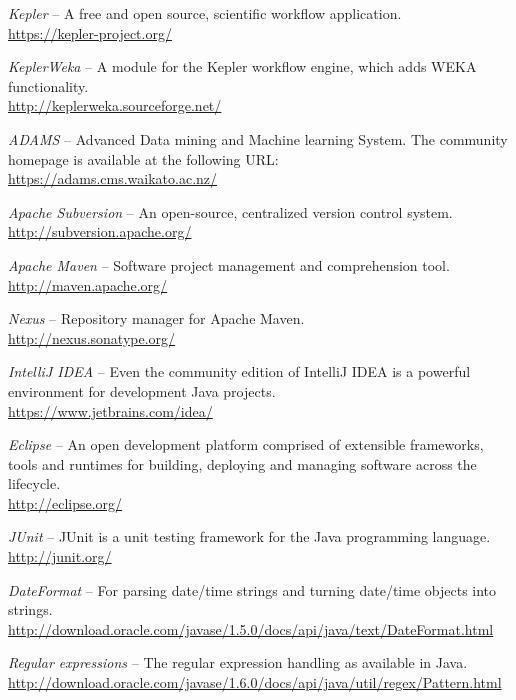 
\begin{thebibliography}{999}

		\textit{Kepler} -- A free and open source, scientific workflow application. \\
		\url{https://kepler-project.org/}{}

		\textit{KeplerWeka} -- A module for the Kepler workflow engine, which adds
		WEKA functionality. \\
		\url{http://keplerweka.sourceforge.net/}{}

		\textit{ADAMS} -- Advanced Data mining and Machine learning System. The
		community homepage is available at the following URL: \\
		\url{https://adams.cms.waikato.ac.nz/}{}

		\textit{Apache Subversion} -- An open-source, centralized version control
		system. \\
		\url{http://subversion.apache.org/}{}

		\textit{Apache Maven} -- Software project management and comprehension tool.
		\\
		\url{http://maven.apache.org/}{}

		\textit{Nexus} -- Repository manager for Apache Maven. \\
		\url{http://nexus.sonatype.org/}{}

		\textit{IntelliJ IDEA} -- Even the community edition of IntelliJ IDEA
		is a powerful environment for development Java projects. \\
		\url{https://www.jetbrains.com/idea/}{}

		\textit{Eclipse} -- An open development platform comprised of extensible
		frameworks, tools and runtimes for building, deploying and managing
		software across the lifecycle. \\
		\url{http://eclipse.org/}{}

		\textit{JUnit} -- JUnit is a unit testing framework for the Java
		programming language. \\
		\url{http://junit.org/}{}
		
		\textit{DateFormat} -- For parsing date/time strings and turning date/time
		objects into strings.
		\url{http://download.oracle.com/javase/1.5.0/docs/api/java/text/DateFormat.html}{}
		
		\textit{Regular expressions} -- The regular expression handling as available
		in Java.
		\url{http://download.oracle.com/javase/1.6.0/docs/api/java/util/regex/Pattern.html}{}

\end{thebibliography}
